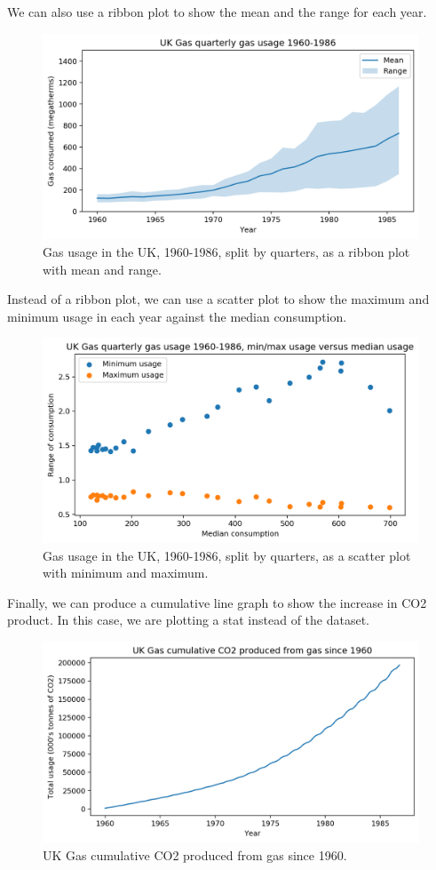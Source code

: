 \documentclass[a4paper, openany]{memoir}
\begin{document}
\noindent We can also use a ribbon plot to show the mean and the range for each year.
\begin{figure}[H]
    \centering
    \includegraphics[scale=0.4]{src/2.21 Gas Example Plot 6.png}
    \caption{Gas usage in the UK, 1960-1986, split by quarters, as a ribbon plot with mean and range.}
\end{figure}
\noindent Instead of a ribbon plot, we can use a scatter plot to show the maximum and minimum usage in each year against the median consumption.
\begin{figure}[H]
    \centering
    \includegraphics[scale=0.4]{src/2.22 Gas Example Plot 7.png}
    \caption{Gas usage in the UK, 1960-1986, split by quarters, as a scatter plot with minimum and maximum.}
\end{figure}
\noindent Finally, we can produce a cumulative line graph to show the increase in CO2 product. In this case, we are plotting a stat instead of the dataset.
\begin{figure}[H]
    \centering
    \includegraphics[scale=0.4]{src/2.23 Gas Example Plot 8.png}
    \caption{UK Gas cumulative CO2 produced from gas since 1960.}
\end{figure}
\newpage
\end{document}
